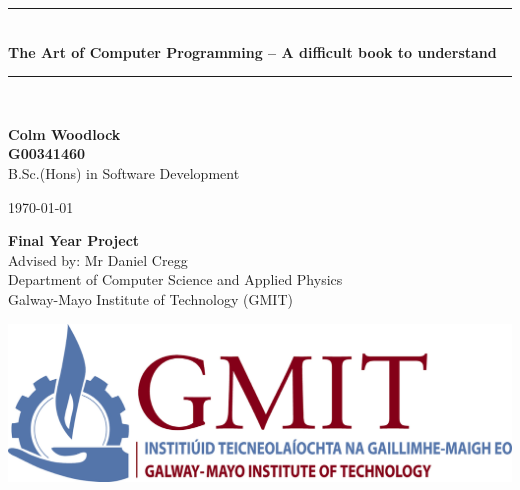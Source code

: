 \documentclass[12pt,a4paper,oneside,openany]{book}
\newcommand{\projecttitle}{The Art of Computer Programming -- A difficult book to understand}
\newcommand{\projectauthor}{Colm Woodlock \\[0.2cm] G00341460}
\newcommand{\projectadvisor}{Mr Daniel Cregg}
\newcommand{\projectprogramme}{B.Sc.(Hons) in Software Development}
\newcommand{\projectdate}{\today}
\begin{document}
  \begin{titlepage}
    \begin{minipage}[t][6cm]{\textwidth}
      \centering
      \rule{\linewidth}{0.5mm} \\[0.4cm]
      { \LARGE \bfseries \projecttitle \\[0.4cm] }
      \rule{\linewidth}{0.5mm} \\[0.8cm]
    \end{minipage}
    
    \begin{minipage}[t][6.5cm]{\textwidth}
      \centering
      \textbf{\projectauthor}\\[0.5cm]
      \projectprogramme
    \end{minipage}
  
    \begin{minipage}[t][1cm]{\textwidth}
      \centering
      \textsc{\projectdate}
    \end{minipage}
      
    \begin{minipage}[t][3cm]{\textwidth}
      \centering
      \textbf{Final Year Project}\\[0.3cm]
      Advised by: \projectadvisor \\[0.1cm]
      Department of Computer Science and Applied Physics\\
      Galway-Mayo Institute of Technology (GMIT)
    \end{minipage}
  
    \begin{center}    
      \includegraphics{img/gmit-logo.jpg}
    \end{center}
  \end{titlepage}
  \setcounter{page}{2}
  \tableofcontents
  
  
  
\end{document}

